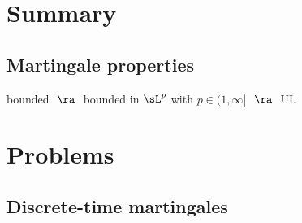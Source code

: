 \section{Summary}

\subsection{Martingale properties}

bounded $\ \ra\ $ bounded in $\sL^p$ with $p\in (1,\infty]$ $\ \ra \ $ UI.


\section{Problems}

\subsection{Discrete-time martingales}

